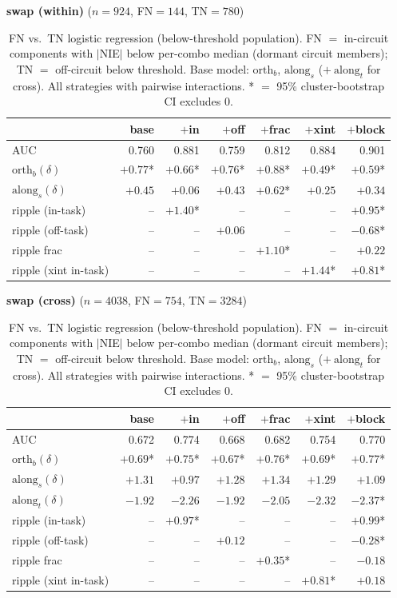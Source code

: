\begin{table}[t]
\centering
\caption{FN vs.\ TN logistic regression (below-threshold population). FN $=$ in-circuit components with $|$NIE$|$ below per-combo median (dormant circuit members); TN $=$ off-circuit below threshold. Base model: $\mathrm{orth}_b$, $\mathrm{along}_s$ ($+\ \mathrm{along}_t$ for cross). All strategies with pairwise interactions. * $=$ 95\% cluster-bootstrap CI excludes 0.}
\label{tab:fntn-ripple}
\small

\medskip
\textbf{swap (within)} ($n=924$, FN$=144$, TN$=780$)

\begin{tabular}{l r r r r r r}
\toprule
 & base & $+$in & $+$off & $+$frac & $+$xint & $+$block \\
\midrule
AUC & 0.760 & 0.881 & 0.759 & 0.812 & 0.884 & 0.901 \\
$\mathrm{orth}_b(\delta)$ & $+0.77$* & $+0.66$* & $+0.76$* & $+0.88$* & $+0.49$* & $+0.59$* \\
$\mathrm{along}_s(\delta)$ & $+0.45$ & $+0.06$ & $+0.43$ & $+0.62$* & $+0.25$ & $+0.34$ \\
ripple (in-task) & -- & $+1.40$* & -- & -- & -- & $+0.95$* \\
ripple (off-task) & -- & -- & $+0.06$ & -- & -- & $-0.68$* \\
ripple frac & -- & -- & -- & $+1.10$* & -- & $+0.22$ \\
ripple (xint in-task) & -- & -- & -- & -- & $+1.44$* & $+0.81$* \\
\bottomrule
\end{tabular}

\medskip
\textbf{swap (cross)} ($n=4038$, FN$=754$, TN$=3284$)

\begin{tabular}{l r r r r r r}
\toprule
 & base & $+$in & $+$off & $+$frac & $+$xint & $+$block \\
\midrule
AUC & 0.672 & 0.774 & 0.668 & 0.682 & 0.754 & 0.770 \\
$\mathrm{orth}_b(\delta)$ & $+0.69$* & $+0.75$* & $+0.67$* & $+0.76$* & $+0.69$* & $+0.77$* \\
$\mathrm{along}_s(\delta)$ & $+1.31$ & $+0.97$ & $+1.28$ & $+1.34$ & $+1.29$ & $+1.09$ \\
$\mathrm{along}_t(\delta)$ & $-1.92$ & $-2.26$ & $-1.92$ & $-2.05$ & $-2.32$ & $-2.37$* \\
ripple (in-task) & -- & $+0.97$* & -- & -- & -- & $+0.99$* \\
ripple (off-task) & -- & -- & $+0.12$ & -- & -- & $-0.28$* \\
ripple frac & -- & -- & -- & $+0.35$* & -- & $-0.18$ \\
ripple (xint in-task) & -- & -- & -- & -- & $+0.81$* & $+0.18$ \\
\bottomrule
\end{tabular}


\end{table}
